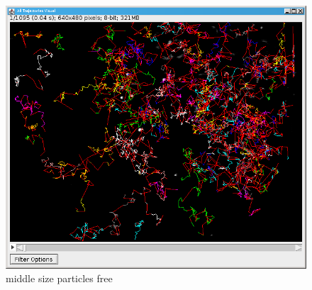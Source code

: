 \documentclass[a4paper,12pt,twoside]{article}	%
\begin{document}
\begin{figure}
\centering
\begin{minipage}{.5\textwidth}
	\centering
	\includegraphics[width=.95\linewidth]{./figures/traj_moyen_free}
	\caption{middle size particles free}
	\label{fig:test2}
\end{minipage}
\end{figure}
\end{document}
